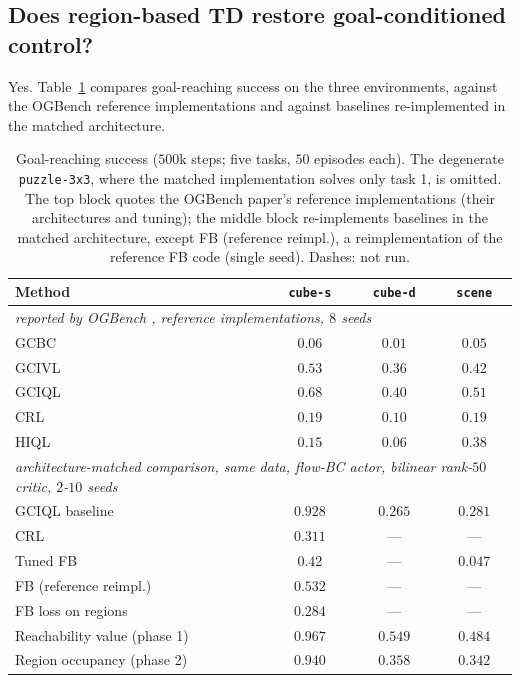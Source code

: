 \documentclass{article}
\begin{document}
\subsection{Does region-based TD restore goal-conditioned control?}
\label{sec:rq1}\label{sec:results}

Yes.
Table~\ref{tab:main} compares goal-reaching success on the three environments, against the OGBench reference implementations and against baselines re-implemented in the matched architecture.

\begin{table}[t]
\centering\small
\begin{tabular}{l ccc}
\toprule
Method & \texttt{cube-s} & \texttt{cube-d} & \texttt{scene} \\
\midrule
\multicolumn{4}{l}{\emph{reported by OGBench \citep{park2024ogbench}, reference implementations, $8$ seeds}} \\
GCBC   & $0.06$ & $0.01$ & $0.05$ \\
GCIVL  & $0.53$ & $0.36$ & $0.42$ \\
GCIQL  & $0.68$ & $0.40$ & $0.51$ \\
CRL    & $0.19$ & $0.10$ & $0.19$ \\
HIQL   & $0.15$ & $0.06$ & $0.38$ \\
\midrule
\multicolumn{4}{l}{\emph{architecture-matched comparison, same data, flow-BC actor, bilinear rank-$50$ critic, $2$-$10$ seeds}} \\
GCIQL baseline           & $0.928$ & $0.265$ & $0.281$ \\
CRL                      & $0.311$ & ---     & ---     \\
Tuned FB                 & $0.42$  & ---     & $0.047$ \\
FB (reference reimpl.)   & $0.532$ & ---     & ---     \\
FB loss on regions       & $0.284$ & ---     & ---     \\
\midrule
Reachability value (phase 1) & $\mathbf{0.967}$ & $\mathbf{0.549}$ & $\mathbf{0.484}$ \\
Region occupancy (phase 2)   & $0.940$ & $0.358$ & $0.342$ \\
\bottomrule
\end{tabular}
\caption{Goal-reaching success ($500$k steps; five tasks, $50$ episodes each).
The degenerate \texttt{puzzle-3x3}, where the matched implementation solves only task 1, is omitted.
The top block quotes the OGBench paper's reference implementations (their architectures and tuning); the middle block re-implements baselines in the matched architecture, except FB (reference reimpl.), a reimplementation of the reference FB code (single seed).
Dashes: not run.}
\label{tab:main}
\end{table}
\end{document}
